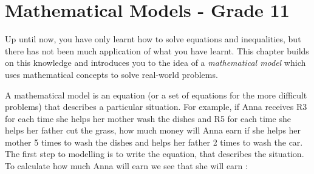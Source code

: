 \chapter{Mathematical Models - Grade 11}
\label{m:se:m11}

Up until now, you have only learnt how to solve equations and inequalities, but there has not been much application of what you have learnt. This chapter builds on this knowledge and introduces you to the idea of a \textit{mathematical model} which uses mathematical concepts to solve real-world problems.



A mathematical model is an equation (or a set of equations for the more difficult problems) that describes a particular situation.
For example, if Anna receives R3 for each time she helps her mother wash the dishes and R5 for each time she helps her father cut the grass, how much money will Anna earn if she helps her mother 5 times to wash the dishes and helps her father 2 times to wash the car.
The first step to modelling is to write the equation, that describes the situation. To calculate how much Anna will earn we see that she will earn :

